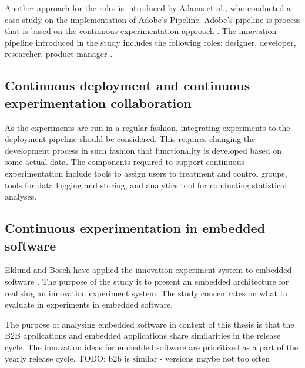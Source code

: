\documentclass[english]{tktltiki2}
\theoremstyle{definition}
\theoremstyle{remark}
\begin{document}
Another approach for the roles is introduced by Adams et al., who conducted a case study on the implementation of Adobe's Pipeline. Adobe's pipeline is process that is based on the continuous experimentation approach \cite{adams2013creating, adobe}. The innovation pipeline introduced in the study includes the following roles: designer, developer, researcher, product manager \cite{adobe}.

\subsection{Continuous deployment and continuous experimentation collaboration}
As the experiments are run in a regular fashion, integrating experiments to the deployment pipeline should be considered. This requires changing the development process in such fashion that functionality is developed based on some actual data. The components required to support continuous experimentation include tools to assign users to treatment and control groups, tools for data logging and storing, and analytics tool for conducting statistical analyses.

\subsection{Continuous experimentation in embedded software}
Eklund and Bosch have applied the innovation experiment system to embedded software \cite{eklund2012architecture}. The purpose of the study is to present an embedded architecture for realising an innovation experiment system. The study concentrates on what to evaluate in experiments in embedded software. 

The purpose of analysing embedded software in context of this thesis is that the B2B applications and embedded applications share similarities in the release cycle. The innovation ideas for embedded software are prioritized as a part of the yearly release cycle. 
TODO: b2b is similar - versions maybe not too often
\end{document}
